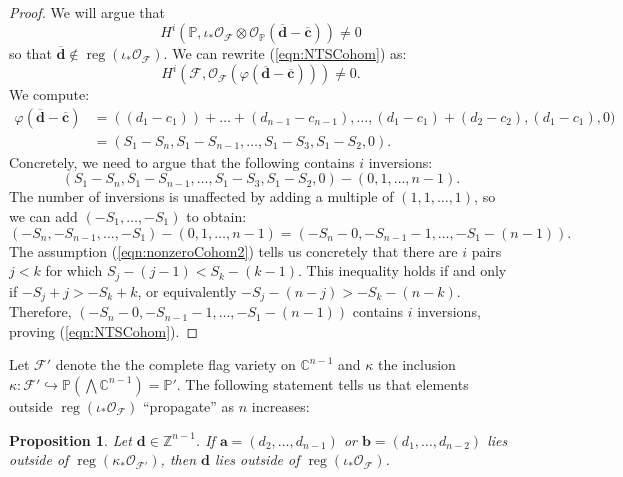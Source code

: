 \documentclass[12pt,reqno]{amsart}
\newtheorem{proposition}[theorem]{Proposition}
\theoremstyle{definition}
\theoremstyle{remark}
\newcommand{\reg}{\operatorname{reg}}
\newcommand{\calF}{{\mathcal{F}}}
\newcommand{\calO}{{\mathcal{O}}}
\begin{document}
\begin{proof}
    We will argue that
    \begin{equation}\label{eqn:NTSCohom}
        H^i(\mathbb P,\iota_*\calO_{\calF}\otimes \calO_{\mathbb P}(\overline{\mathbf d}-\overline{\mathbf c})) \neq 0
    \end{equation}
    so that $\mathbf{\overline d} \notin \reg(\iota_*\calO_{\calF})$.  We can rewrite (\ref{eqn:NTSCohom}) as:
    \[
    H^i(\calF,\calO_{\calF}(\varphi(\overline{\mathbf d}-\overline{\mathbf c}))) \neq 0.
    \]
    We compute:
    \begin{align*}
        \varphi(\overline{\mathbf d}-\overline{\mathbf c}) &= ((d_1-c_1))+\ldots+(d_{n-1}-c_{n-1}),\ldots, (d_1-c_1)+(d_2-c_2),(d_1-c_1),0)\\
        &= (S_1-S_n,S_1-S_{n-1},\ldots,S_1-S_3,S_1-S_2,0).
    \end{align*}
    Concretely, we need to argue that the following contains $i$ inversions:
    \[
    (S_1-S_n,S_1-S_{n-1},\ldots,S_1-S_3,S_1-S_2,0) - (0,1,\ldots,n-1).
    \]
    The number of inversions is unaffected by adding a multiple of $(1,1,\ldots,1)$, so we can add $(-S_1,\ldots,-S_1)$ to obtain:
    \[
    (-S_n,-S_{n-1},\ldots,-S_1) - (0,1,\ldots,n-1) = (-S_n - 0, -S_{n-1}-1,\ldots, -S_1-(n-1)).
    \]
    The assumption (\ref{eqn:nonzeroCohom2}) tells us concretely that there are $i$ pairs $j<k$ for which $S_j-(j-1)<S_k-(k-1)$.  This inequality holds if and only if $-S_j+j > -S_k + k$, or equivalently $-S_j-(n-j) > -S_k-(n-k)$.  Therefore, $(-S_n - 0, -S_{n-1}-1,\ldots, -S_1-(n-1))$ contains $i$ inversions, proving (\ref{eqn:NTSCohom}).
\end{proof}

Let $\calF'$ denote the the complete flag variety on $\mathbb C^{n-1}$ and $\kappa$ the inclusion $\kappa: \calF' \hookrightarrow \mathbb P\left(\bigwedge\mathbb C^{n-1}\right)= \mathbb P'$.  The following statement tells us that elements outside $\reg(\iota_*\calO_{\calF})$ ``propagate'' as $n$ increases:

\begin{proposition}
\label{prop:inductive}
    Let $\mathbf{d} \in \mathbb Z^{n-1}$.  If $\mathbf{a} = (d_2,\ldots,d_{n-1})$ or $\mathbf{b} = (d_1,\ldots,d_{n-2})$ lies outside of $\reg(\kappa_*\calO_{\calF'})$, then $\mathbf{d}$ lies outside of $\reg(\iota_*\calO_{\calF})$.
\end{proposition}
\end{document}
